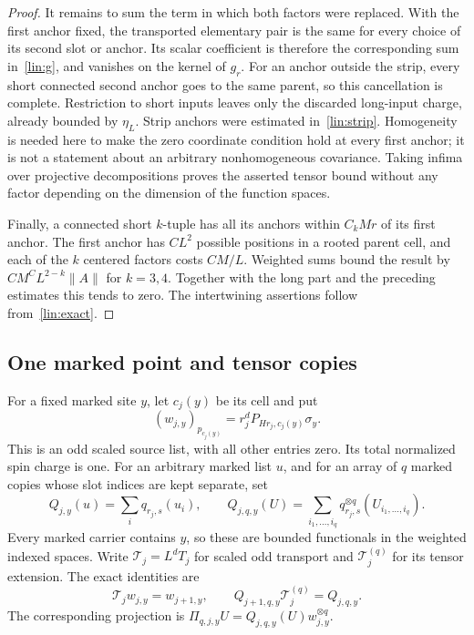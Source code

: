 \begin{proof}
It remains to sum the term in which both factors were replaced.  With the
first anchor fixed, the transported elementary pair is the same for every
choice of its second slot or anchor.  Its scalar coefficient is therefore
the corresponding sum in~\eqref{lin:g}, and vanishes on the kernel of $g_r$.
For an anchor outside the strip, every short connected second anchor goes
to the same parent, so this cancellation is complete.  Restriction to short
inputs leaves only the discarded long-input charge, already bounded by
$\eta_L$.  Strip anchors were estimated in~\eqref{lin:strip}.  Homogeneity
is needed here to make the zero coordinate condition hold at every first
anchor; it is not a statement about an arbitrary nonhomogeneous covariance.
Taking infima over projective decompositions proves the asserted tensor
bound without any factor depending on the dimension of the function spaces.

Finally, a connected short $k$-tuple has all its anchors within $C_k M r$
of its first anchor.  The first anchor has $C L^2$ possible positions in a
rooted parent cell, and each of the $k$ centered factors costs $C M/L$.
Weighted sums bound the result by $C M^C L^{2-k}\|A\|$ for $k=3,4$.
Together with the long part and the preceding estimates this tends to zero.
The intertwining assertions follow from~\eqref{lin:exact}.
\end{proof}

\subsection{One marked point and tensor copies}
For a fixed marked site $y$, let $c_j(y)$ be its cell and put
\begin{equation}\label{lin:w}
 (w_{j,y})_{p_{c_j(y)}}=r_j^dP_{Hr_j,c_j(y)}\sigma_y.
\end{equation}
This is an odd scaled source list, with all other entries zero.  Its total
normalized spin charge is one.  For an arbitrary marked list $u$, and for
an array of $q$ marked copies whose slot indices are kept separate, set
\[
 Q_{j,y}(u)=\sum_i q_{r_j,s}(u_i),\qquad
 Q_{j,q,y}(U)=\sum_{i_1,\ldots,i_q}
                   q_{r_j,s}^{\otimes q}(U_{i_1,\ldots,i_q}).
\]
Every marked carrier contains $y$, so these are bounded functionals in the
weighted indexed spaces.  Write $\mathcal T_j=L^dT_j$ for scaled odd
transport and $\mathcal T_j^{(q)}$ for its tensor extension.  The exact
identities are
\[
 \mathcal T_jw_{j,y}=w_{j+1,y},\qquad
 Q_{j+1,q,y}\mathcal T_j^{(q)}=Q_{j,q,y}.
\]
The corresponding projection is
$\Pi_{q,j,y}U=Q_{j,q,y}(U)w_{j,y}^{\otimes q}$.


